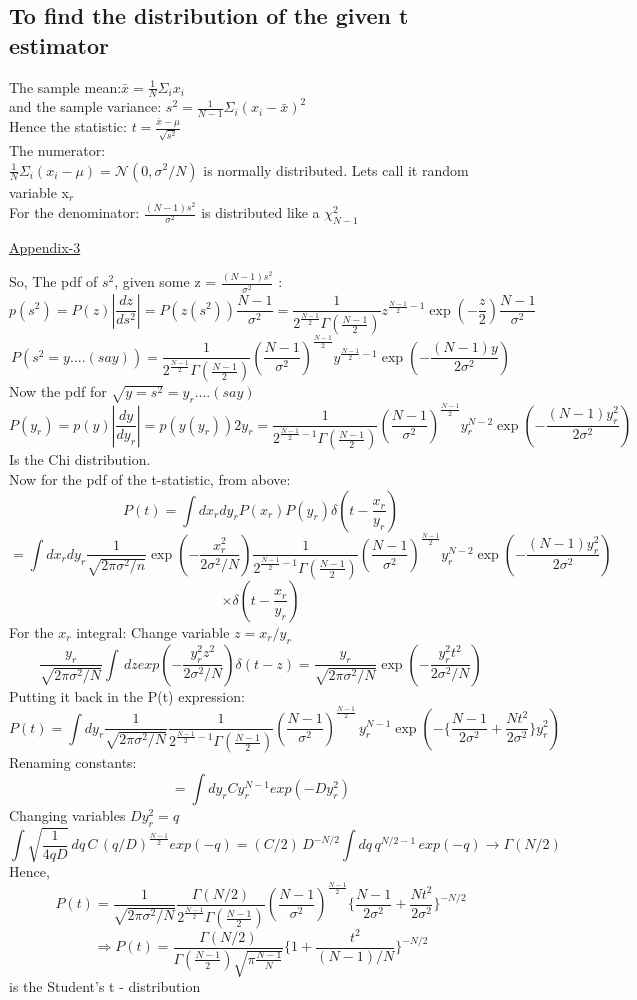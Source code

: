 \documentclass[11pt]{article}
\begin{document}
	\subsection{To find the distribution of the given t estimator}
	
	The sample mean:\(\bar{x} = \frac{1}{N}\Sigma_i x_i\)\\
	and the sample variance: \(s^2 = \frac{1}{N-1} \Sigma_i (x_i - \bar{x})^2\)\\
	Hence the statistic: \(t = \frac{\bar{x} - \mu}{\sqrt{s^2}}\)\\
	The numerator:\\
	 \( \frac{1}{N} \Sigma_i (x_i - \mu) = \mathcal{N}(0,\sigma^2/N)\) is normally distributed. Lets call it random variable x$_r$\\
	For the denominator:
	\(
		\frac{(N-1) s^2}{\sigma^2} 
	\) is distributed like a \( \chi^2_{N-1}\)
	
	
	\hyperlink{page.12}{\Huge \color{red}Appendix-3}

	So, The pdf of $s^2$, given some z = $\frac{(N-1) s^2}{\sigma^2}$ :
	\[
		p(s^2) = P(z) |\frac{dz}{ds^2}| = P(z(s^2))\frac{N-1}{\sigma^2} = \frac{1}{2^{\frac{N-1}{2}}\Gamma(\frac{N-1}{2})} z^{\frac{N-1}{2}-1} \exp(-\frac{z}{2})\frac{N-1}{\sigma^2}
	\]
	\[
		 P(s^2 = y....(say))= \frac{1}{2^{\frac{N-1}{2}}\Gamma(\frac{N-1}{2})} (\frac{N-1}{\sigma^2})^{\frac{N-1}{2}} y^{\frac{N-1}{2}-1} \exp(-\frac{(N-1)y}{2\sigma^2})
	\]
	Now the pdf for $\sqrt{y = s^2} = y_r....(say)$
	\[
		P(y_r) = p(y)|\frac{dy}{dy_r}| = p(y(y_r))2y_r = \frac{1}{2^{\frac{N-1}{2}-1}\Gamma(\frac{N-1}{2})} (\frac{N-1}{\sigma^2})^{\frac{N-1}{2}} y_r^{N-2} \exp(-\frac{(N-1)y_r^2}{2\sigma^2})
	\]
	Is the Chi distribution.\\
	Now for the pdf of the t-statistic, from above:
	\[
		P(t) = \int dx_r dy_r P(x_r)P(y_r) \delta(t - \frac{x_r}{y_r}) 
	\]
	\[
		= \int dx_r dy_r \frac{1}{\sqrt{2\pi \sigma^2/n}} \exp(-\frac{x_r^2}{2\sigma^2/N})\frac{1}{2^{\frac{N-1}{2}-1}\Gamma(\frac{N-1}{2})} (\frac{N-1}{\sigma^2})^{\frac{N-1}{2}} y_r^{N-2} \exp(-\frac{(N-1)y_r^2}{2\sigma^2})
	\]
	\[
		\times \delta(t- \frac{x_r}{y_r})
	\]
	For the $x_r$ integral:
	Change variable $z = x_r/y_r$ 
	\[
		\frac{y_r}{\sqrt{2\pi \sigma^2/N}}\int \, dz exp(-\frac{y_r^2 z^2}{2\sigma^2/N})\delta(t-z) = \frac{y_r}{\sqrt{2\pi \sigma^2/N}} \exp(-\frac{y_r^2t^2}{2\sigma^2/N})
	\]
	Putting it back in the P(t) expression:
	\[
		P(t) = \int d y_r \frac{1}{\sqrt{2\pi\sigma^2/N}}\frac{1}{2^{\frac{N-1}{2}-1}\Gamma(\frac{N-1}{2})}(\frac{N-1}{\sigma^2})^{\frac{N-1}{2}}\,  y_r^{N-1} \exp(-\{\frac{N-1}{2\sigma^2}+\frac{Nt^2}{2\sigma^2}\}y_r^2)                                   
	\]
	Renaming constants:
	\[
		= \int dy_r C y_r^{N-1} exp(-Dy_r^2) 
	\]
	Changing variables $Dy_r^2 = q$
	\[
		\int  \sqrt{\frac{1}{4qD}}\,dq \, C \, (q/D)^{\frac{N-1}{2}}exp(-q) = (C/2) \, D^{-N/2} \int dq \, q^{N/2-1} \, exp(-q) \rightarrow \Gamma(N/2)
	\]
	Hence,
	\[
		P(t) = \frac{1}{\sqrt{2\pi\sigma^2/N}}\frac{\Gamma(N/2)}{2^{\frac{N-1}{2}}\Gamma(\frac{N-1}{2})}(\frac{N-1}{\sigma^2})^{\frac{N-1}{2}}\{\frac{N-1}{2\sigma^2} + \frac{Nt^2}{2\sigma^2}\}^{-N/2}
	\]
	\[
		\Rightarrow \boxed{P(t) = \frac{\Gamma(N/2)}{\Gamma(\frac{N-1}{2})\sqrt{\pi \frac{N-1}{N}}}\{1 + \frac{t^2}{(N-1)/N}\}^{-N/2}}
	\]
	is the Student's t - distribution
	
\end{document}
